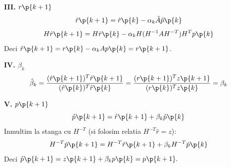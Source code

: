 \begin{demonstratie}
    \bigskip

    \textbf{III. $r\p{k + 1}$} \\
    $$ \hat{r}\p{k+1} = \hat{r}\p{k} - \alpha_k \hat{A} \hat{p}\p{k} $$
    $$ H\hat{r}\p{k+1} = H\hat{r}\p{k} - \alpha_k H(H^{-1} A H^{-T}) H^T p\p{k} $$
    Deci $ \hat{r}\p{k+1} = r\p{k} - \alpha_k A p\p{k} = r\p{k + 1}$.

    \bigskip

    \textbf{IV. $\beta_k$} \\
    $$ \hat{\beta}_k = \frac{(\hat{r}\p{k+1})^T \hat{r}\p{k+1}}{(\hat{r}\p{k})^T \hat{r}\p{k}} = \frac{(r\p{k+1})^T z\p{k+1}}{(r\p{k})^T z\p{k}} = \beta_k$$

    \bigskip

    \textbf{V. $p\p{k+1}$} \\
    $$ \hat{p}\p{k+1} = \hat{r}\p{k+1} + \beta_k \hat{p}\p{k} $$
    Inmultim la stanga cu $H^{-T}$ (si folosim relatia $H^{-T}\hat{r} = z$):
    $$ H^{-T}\hat{p}\p{k+1} = H^{-T}\hat{r}\p{k+1} + \beta_k H^{-T}\hat{p}\p{k} $$
    Deci $ \hat{p}\p{k+1} = z\p{k+1} + \beta_k p\p{k} = p\p{k + 1}. $

\end{demonstratie}